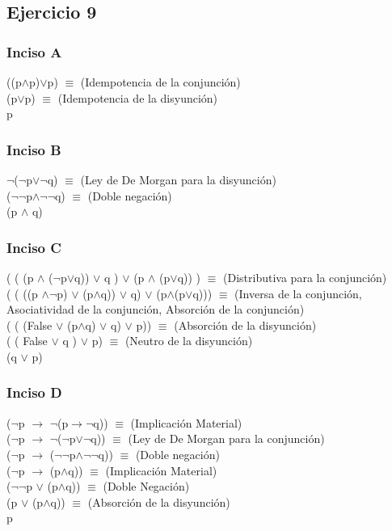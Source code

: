 	\subsection{Ejercicio 9}
	
		\subsubsection{Inciso A}
		((p$\wedge$p)$\vee$p) $\equiv$ (Idempotencia de la conjunción)\\
		(p$\vee$p) $\equiv$ (Idempotencia de la disyunción)\\
		 p
		 
		 \subsubsection{Inciso B}
		 $\neg$($\neg$p$\vee$$\neg$q) $\equiv$ (Ley de De Morgan para la disyunción)\\
		 ($\neg$$\neg$p$\wedge$$\neg$$\neg$q) $\equiv$ (Doble negación)\\
		 (p $\wedge$ q)
	
		\subsubsection{Inciso C}
		( ( (p $\wedge$ ($\neg$p$\vee$q)) $\vee$ q ) $\vee$ (p $\wedge$ (p$\vee$q)) ) $\equiv$ (Distributiva para la conjunción)\\
		( ( ((p $\wedge$$\neg$p) $\vee$ (p$\wedge$q)) $\vee$ q) $\vee$ (p$\wedge$(p$\vee$q))) $\equiv$ (Inversa de la conjunción, Asociatividad de la conjunción, Absorción de la conjunción)\\
		( ( (False $\vee$ (p$\wedge$q) $\vee$ q) $\vee$ p)) $\equiv$ (Absorción de la disyunción)\\
		( ( False $\vee$ q ) $\vee$ p) $\equiv$ (Neutro de la disyunción)\\
		(q $\vee$ p)
		
		\subsubsection{Inciso D}
		($\neg$p $\rightarrow$ $\neg$(p$\rightarrow$$\neg$q)) $\equiv$ (Implicación Material)\\
		($\neg$p $\rightarrow$ $\neg$($\neg$p$\vee$$\neg$q)) $\equiv$ (Ley de De Morgan para la conjunción)\\
		($\neg$p $\rightarrow$ ($\neg$$\neg$p$\wedge$$\neg$$\neg$q)) $\equiv$ (Doble negación)\\
		($\neg$p $\rightarrow$ (p$\wedge$q)) $\equiv$ (Implicación Material)\\
		($\neg$$\neg$p $\vee$ (p$\wedge$q)) $\equiv$ (Doble Negación)\\
		(p $\vee$ (p$\wedge$q)) $\equiv$ (Absorción de la disyunción)\\
		p
		

